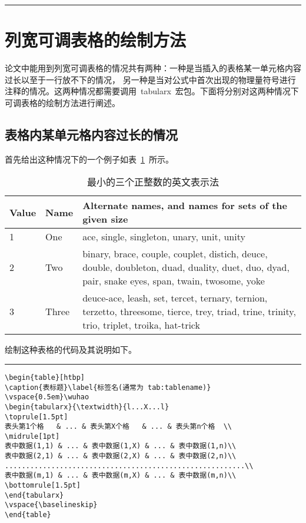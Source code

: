 \noindent\hrule
\section{列宽可调表格的绘制方法}
论文中能用到列宽可调表格的情况共有两种：一种是当插入的表格某一单元格内容过长以至于一行放不下的情况，
另一种是当对公式中首次出现的物理量符号进行注释的情况。这两种情况都需要调用~tabularx~宏包。下面将分别对这两种情况下可调表格的绘制方法进行阐述。
\subsection{表格内某单元格内容过长的情况}

首先给出这种情况下的一个例子如表~\ref{tab:table3}~所示。
\begin{table}[htbp]
\caption{最小的三个正整数的英文表示法}\label{tab:table3}
\vspace{0.5em}\wuhao
\begin{tabularx}{\textwidth}{llX}
\toprule[1.5pt]
Value & Name & Alternate names, and names for sets of the given size\\\midrule[1pt]
1 & One & ace, single, singleton, unary, unit, unity\\
2 & Two & binary, brace, couple, couplet, distich, deuce, double, doubleton, duad, duality, duet, duo, dyad, pair, snake eyes, span, twain, twosome, yoke\\
3 & Three & deuce-ace, leash, set, tercet, ternary, ternion, terzetto, threesome, tierce, trey, triad, trine, trinity, trio, triplet, troika, hat-trick\\\bottomrule[1.5pt]
\end{tabularx}
\vspace{\baselineskip}
\end{table}
绘制这种表格的代码及其说明如下。
\vspace{1em}\noindent\hrule
\begin{verbatim}
\begin{table}[htbp]
\caption{表标题}\label{标签名(通常为 tab:tablename)}
\vspace{0.5em}\wuhao
\begin{tabularx}{\textwidth}{l...X...l}
\toprule[1.5pt]
表头第1个格   & ... & 表头第X个格   & ... & 表头第n个格  \\
\midrule[1pt]
表中数据(1,1) & ... & 表中数据(1,X) & ... & 表中数据(1,n)\\
表中数据(2,1) & ... & 表中数据(2,X) & ... & 表中数据(2,n)\\
.........................................................\\
表中数据(m,1) & ... & 表中数据(m,X) & ... & 表中数据(m,n)\\
\bottomrule[1.5pt]
\end{tabularx}
\vspace{\baselineskip}
\end{table}
\end{verbatim}


